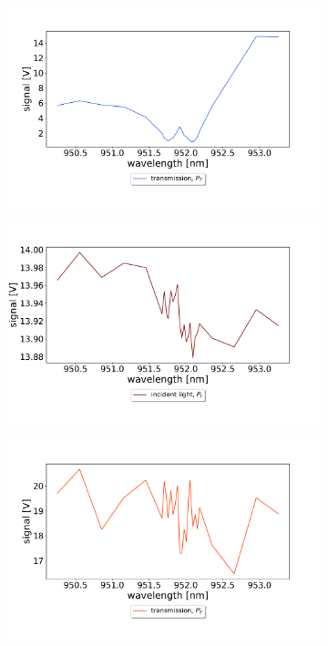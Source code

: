 \begin{figure}[h!]
    \centering
    \begin{subfigure}[b]{0.49\textwidth}
        \includegraphics[width=\textwidth]{figures/raw_data_cavity_trans.pdf}
        \caption{}
        \label{fig:raw_data_trans_with_cavity}
    \end{subfigure}
    \begin{subfigure}[b]{0.49\textwidth}
        \includegraphics[width=\textwidth]{figures/raw_data_incident_light_cavity.pdf}
        \caption{}
        \label{fig:raw_data_incident_with_cavity}
    \end{subfigure}
    \begin{subfigure}[b]{0.49\textwidth}
        \includegraphics[width=\textwidth]{figures/raw_data_transmission_no_cavity.pdf}

\end{subfigure}
\end{figure}
